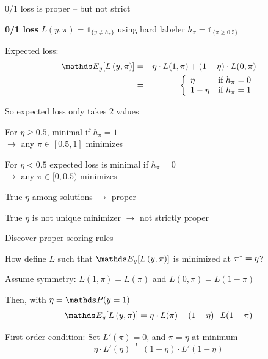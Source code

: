 \documentclass[11pt,compress,t,notes=noshow, xcolor=table]{beamer}
\providecommand{\Lpiy}{L\left(y, \pi\right)} %
\begin{document}
\begin{framei}[sep=M]{0/1 loss is proper -- but not strict}

\item \textbf{0/1 loss} $\Lpiy=\mathds{1}_{\{y \neq h_\pi\}}$ using hard labeler  $h_{\pi}=\mathds{1}_{\{\pi\geq0.5\}}$ 
\item Expected loss:
\begin{eqnarray*}
\E_y[\Lpiy] &=& \eta \cdot L(1,\pi) + (1-\eta) \cdot L(0,\pi)\\
&=& \left\{
\begin{array}{ll}
\eta & \text{if } h_{\pi} = 0 \\
1-\eta & \text{if } h_{\pi} = 1
\end{array}
\right.
\end{eqnarray*}

\item So expected loss only takes 2 values

\item For $\eta \geq 0.5$, minimal if $h_{\pi}=1$\\ $\rightarrow$ any $\pi \in [0.5,1]$ minimizes 

\item For $\eta < 0.5$ expected loss is minimal if $h_{\pi}=0$\\ $\rightarrow$ any $\pi \in [0, 0.5)$ minimizes 

\item True $\eta$ among solutions $\rightarrow$ proper
\item True $\eta$ is not unique minimizer $\rightarrow$ not strictly proper

\end{framei}

\begin{frame}{Discover proper scoring rules}

\begin{itemizeL}

\item How define $L$ such that $\E_y[\Lpiy]$ is minimized at $\pi^{\ast}=\eta$? 

\item Assume symmetry: 
$L(1,\pi)=L(\pi)$ and $L(0,\pi)=L(1-\pi)$ \\

\end{itemizeL}

{}

\begin{itemizeL}
\item Then, with $\eta = \P(y = 1)$
$$\E_{y}[\Lpiy]=\eta \cdot L(\pi) + (1-\eta) \cdot L(1-\pi)$$
\item First-order condition: Set $L'(\pi) = 0$, and $\pi=\eta$ at minimum 
$$\eta \cdot L'(\eta) \overset{!}{=} (1-\eta) \cdot L'(1-\eta)$$

\end{itemizeL}
\end{frame}
\end{document}
